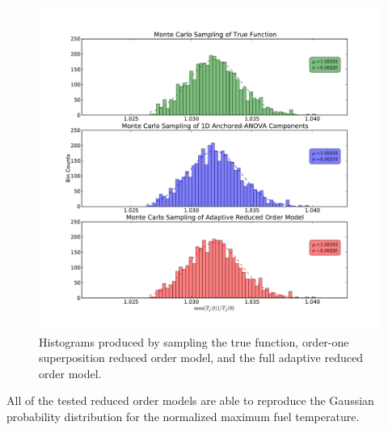 \begin{figure}[!htb]
\caption{\label{fig:pk_histograms}
Histograms produced by sampling the true function, order-one superposition reduced order model, and the full adaptive reduced order model.  
}
 \begin{center}
  \includegraphics[scale=.58]{./Chapter3/pk_histograms.pdf}
 \end{center}
\end{figure}
All of the tested reduced order models are able to reproduce the Gaussian probability distribution for the normalized maximum fuel temperature. 

